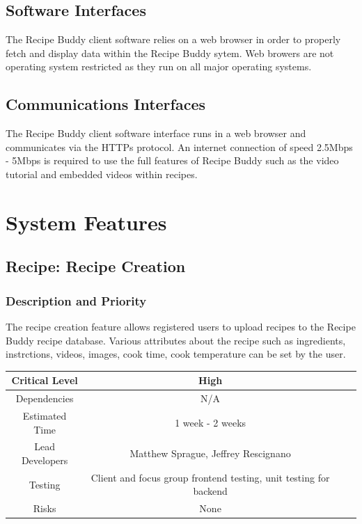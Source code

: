 \documentclass{scrreprt}
\begin{document}
\section{Software Interfaces}
The \gls{Recipe Buddy} client software relies on a web browser in order to properly fetch and display data within the \gls{Recipe Buddy} sytem. Web browers are not operating system restricted as they run on all major operating systems.

\section{Communications Interfaces}
The \gls{Recipe Buddy} client software interface runs in a web browser and communicates via the \gls{HTTPs} protocol. An internet connection of speed 2.5Mbps - 5Mbps is required to use the full features of \gls{Recipe Buddy} such as the video tutorial and embedded videos within recipes.

\chapter{System Features}

\section{Recipe: Recipe Creation}

\subsection{Description and Priority}

The recipe creation feature allows registered users to upload recipes to the \gls{Recipe Buddy} recipe database. Various attributes about the recipe such as ingredients, instrctions, videos, images, cook time, cook temperature can be set by the user.

\begin{center}
    \begin{tabular}{| c | c | c | c |}
        \hline
        Critical Level  & High                                                                 \\
        \hline
        Dependencies    & N/A                                                                  \\
        \hline
        Estimated Time  & 1 week - 2 weeks                                                     \\
        \hline
        Lead Developers & Matthew Sprague, Jeffrey Rescignano \\
        \hline
        Testing         & Client and focus group \gls{frontend} testing,
                          \gls{unit testing} for \gls{backend}                                 \\
        \hline
        Risks           & None                                                                 \\
        \hline
    \end{tabular}
\end{center}
\end{document}
